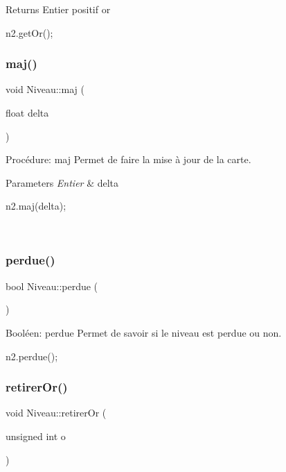 \begin{DoxyReturn}{Returns}
Entier positif or 
\begin{DoxyCode}
n2.getOr();
\end{DoxyCode}
 
\end{DoxyReturn}
\mbox{\label{classNiveau_a4434c142b17c0299d2d7744b2ea11e99}} 
\subsubsection{\texorpdfstring{maj()}{maj()}}
{\footnotesize\ttfamily void Niveau\+::maj (\begin{DoxyParamCaption}\item[{float}]{delta }\end{DoxyParamCaption})}



Procédure\+: maj Permet de faire la mise à jour de la carte. 


\begin{DoxyParams}{Parameters}
{\em Entier} & delta 
\begin{DoxyCode}
n2.maj(delta);
\end{DoxyCode}
 \\
\hline
\end{DoxyParams}
\mbox{\label{classNiveau_a749c4fbb42a1f47bff1b0b845a214d1a}} 
\subsubsection{\texorpdfstring{perdue()}{perdue()}}
{\footnotesize\ttfamily bool Niveau\+::perdue (\begin{DoxyParamCaption}{ }\end{DoxyParamCaption})}



Booléen\+: perdue Permet de savoir si le niveau est perdue ou non. 


\begin{DoxyCode}
n2.perdue();
\end{DoxyCode}
 \mbox{\label{classNiveau_a3192b7514716cfddac9ff465f9ad1f2f}} 
\subsubsection{\texorpdfstring{retirer\+Or()}{retirerOr()}}
{\footnotesize\ttfamily void Niveau\+::retirer\+Or (\begin{DoxyParamCaption}\item[{unsigned int}]{o }\end{DoxyParamCaption})}



